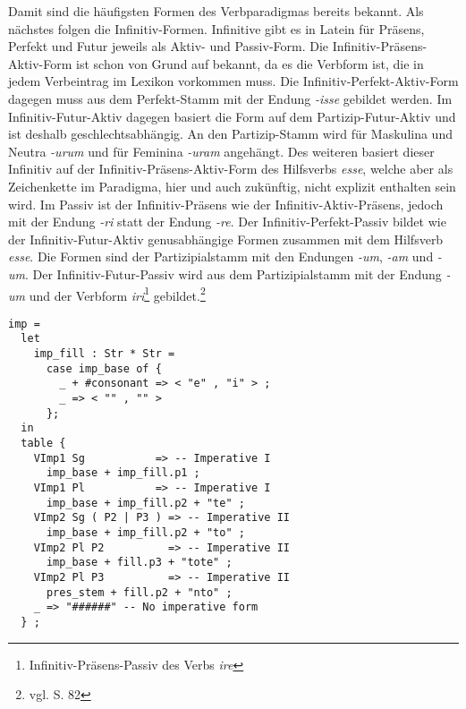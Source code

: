Damit sind die häufigsten Formen des Verbparadigmas bereits bekannt. Als nächstes folgen die Infinitiv-Formen. Infinitive gibt es in Latein für Präsens, Perfekt und Futur jeweils als Aktiv- und Passiv-Form. Die Infinitiv-Präsens-Aktiv-Form ist schon von Grund auf bekannt, da es die Verbform ist, die in jedem Verbeintrag im Lexikon vorkommen muss. Die Infinitiv-Perfekt-Aktiv-Form dagegen muss aus dem Perfekt-Stamm mit der Endung \textit{-isse} gebildet werden. Im Infinitiv-Futur-Aktiv dagegen basiert die Form auf dem Partizip-Futur-Aktiv und ist deshalb geschlechtsabhängig. An den Partizip-Stamm wird für Maskulina und Neutra \textit{-urum} und für Feminina \textit{-uram} angehängt. Des weiteren basiert dieser Infinitiv auf der Infinitiv-Präsens-Aktiv-Form des Hilfsverbs \textit{esse}, welche aber als Zeichenkette im Paradigma, hier und auch zukünftig, nicht explizit enthalten sein wird. Im Passiv ist der Infinitiv-Präsens wie der Infinitiv-Aktiv-Präsens, jedoch mit der Endung \textit{-ri} statt der Endung \textit{-re}. Der Infinitiv-Perfekt-Passiv bildet wie der Infinitiv-Futur-Aktiv genusabhängige Formen zusammen mit dem Hilfsverb \textit{esse}. Die Formen sind der Partizipialstamm mit den Endungen \textit{-um}, \textit{-am} und \textit{-um}. Der Infinitiv-Futur-Passiv wird aus dem Partizipialstamm mit der Endung \textit{-um} und der Verbform \textit{iri}\footnote{Infinitiv-Präsens-Passiv des Verbs \textit{ire}} gebildet.\footnote{vgl. \cite{BAYER-LINDAUER1994} S. 82} \par
\begin{lstlisting}[float=h!tp,caption={Ausschnitt aus der Funktion \texttt{mkVerb} um Infinitiv-Verbformen zu bilden (vgl. \textbf{ResLat.gf})},label={GF-Res-MkVerb-Imp},basicstyle=\small]
imp = 
  let 
    imp_fill : Str * Str =
      case imp_base of {
        _ + #consonant => < "e" , "i" > ;
        _ => < "" , "" >
      };
  in
  table {
    VImp1 Sg           => -- Imperative I
      imp_base + imp_fill.p1 ;
    VImp1 Pl           => -- Imperative I
      imp_base + imp_fill.p2 + "te" ;
    VImp2 Sg ( P2 | P3 ) => -- Imperative II
      imp_base + imp_fill.p2 + "to" ;
    VImp2 Pl P2          => -- Imperative II
      imp_base + fill.p3 + "tote" ;
    VImp2 Pl P3          => -- Imperative II 
      pres_stem + fill.p2 + "nto" ;
    _ => "######" -- No imperative form
  } ;
\end{lstlisting}
